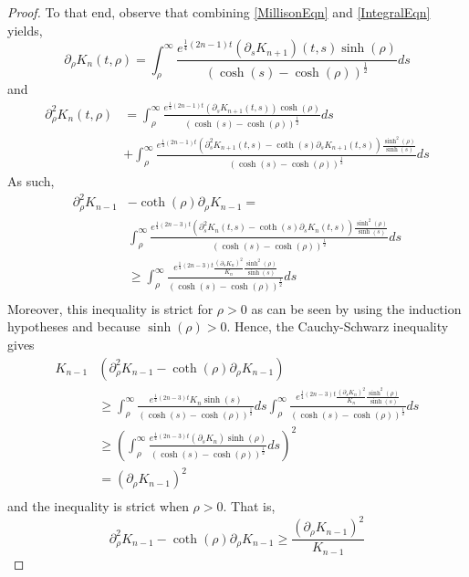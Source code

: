 \documentclass{amsart}
\theoremstyle{definition}
\theoremstyle{remark}
\numberwithin{equation}{section}
\begin{document}
\begin{proof}
	To that end, observe that combining \eqref{MillisonEqn} and \eqref{IntegralEqn} yields,
	$$
	\partial_\rho K_{n}(t,\rho)=\int_{\rho}^\infty \frac{e^{\frac{1}{4} (2n-1)t} (\partial_s K_{n+1})(t, s) \sinh(\rho)}{\left(\cosh (s)-\cosh(\rho)\right)^{\frac{1}{2}}} ds
	$$
	and
	\begin{align*}
	\partial_\rho^2 K_{n}(t, \rho)&= \int_{\rho}^\infty \frac{e^{\frac{1}{4} (2n-1)t} (\partial_s K_{n+1}(t, s) )\cosh(\rho)}{\left(\cosh (s)-\cosh(\rho)\right)^{\frac{1}{2}}} ds\\
	&+\int_{\rho}^\infty \frac{e^{\frac{1}{4} (2n-1)t} (\partial_s^2 K_{n+1}(t, s)-\coth(s) \partial_s K_{n+1}(t,s) )\frac{\sinh^2(\rho)}{\sinh(s)}}{\left(\cosh (s)-\cosh(\rho)\right)^{\frac{1}{2}}} ds
	\end{align*}
	As such,
	\begin{align*}
	\partial_\rho^2 K_{n-1}&-\coth(\rho) \partial_\rho K_{n-1} =\\
	&\int_{\rho}^\infty \frac{e^{\frac{1}{4} (2n-3)t} (\partial_s^2 K_{n}(t, s)-\coth(s) \partial_s K_{n}(t,s) )\frac{\sinh^2(\rho)}{\sinh(s)}}{\left(\cosh (s)-\cosh(\rho)\right)^{\frac{1}{2}}} ds\\
	&\geq \int_{\rho}^\infty \frac{e^{\frac{1}{4} (2n-3)t} \frac{(\partial_s K_{n})^2}{K_n}\frac{\sinh^2(\rho)}{\sinh(s)}}{\left(\cosh (s)-\cosh(\rho)\right)^{\frac{1}{2}}} ds\\
	\end{align*}
	Moreover, this inequality is strict for $\rho>0$ as can be seen by using the induction hypotheses and because $\sinh(\rho)>0$.  
	Hence, the Cauchy-Schwarz inequality gives
	\begin{align*}
	K_{n-1}&\left(\partial_\rho^2 K_{n-1}-\coth(\rho) \partial_\rho K_{n-1} \right) \\
	&\geq \int_{\rho}^\infty \frac{e^{\frac{1}{4} (2n-3)t} K_n \sinh(s)}{\left(\cosh (s)-\cosh(\rho)\right)^{\frac{1}{2}}} ds \int_{\rho}^\infty \frac{e^{\frac{1}{4} (2n-3)t} \frac{(\partial_s K_{n})^2}{K_n}\frac{\sinh^2(\rho)}{\sinh(s)}}{\left(\cosh (s)-\cosh(\rho)\right)^{\frac{1}{2}}} ds\\
	&\geq\left( \int_{\rho}^\infty \frac{e^{\frac{1}{4} (2n-3)t} (\partial_s K_{n}){\sinh(\rho)}}{\left(\cosh (s)-\cosh(\rho)\right)^{\frac{1}{2}}} ds\right)^2\\
	&=\left(\partial_\rho K_{n-1}\right)^2\\
	\end{align*}
	and the inequality is strict when $\rho>0$.
	That is,
	$$
	\partial_\rho^2 K_{n-1}-\coth(\rho) \partial_\rho K_{n-1} \geq \frac{(\partial_\rho K_{n-1})^2}{K_{n-1}}
$$
\end{proof}
\end{document}
